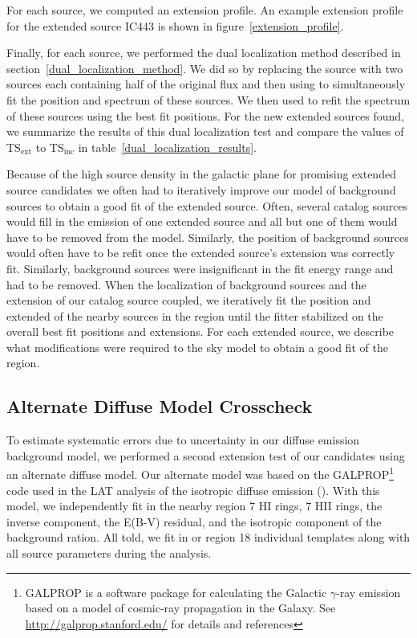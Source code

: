 \documentclass[12pt,preprint]{aastex}
\newcommand{\tsext}{{\ensuremath{\text{TS}_\text{ext}}}\xspace}
\newcommand{\tsinc}{\ensuremath{\text{TS}_\text{inc}}\xspace}
\newcommand{\pointlike}{\text{\em pointlike}\xspace}
\newcommand{\gtlike}{\text{\em gtlike}\xspace}
\begin{document}
For each source, we computed an extension profile.  An example
extension profile for the extended source IC443 is shown in
figure~\ref{extension_profile}.

Finally, for each source, we performed the dual localization method
described in section~\ref{dual_localization_method}.  We did so by
replacing the source with two sources each containing half of the original
flux and then using \pointlike to simultaneously fit the position and
spectrum of these sources.  We then used \gtlike to refit the spectrum of
these sources using the best fit positions. For the new extended sources
found, we summarize the results of this dual localization test and compare
the values of \tsext to \tsinc in table~\ref{dual_localization_results}.

Because of the high source density in the galactic plane for promising
extended source candidates we often had to iteratively improve our model
of background sources to obtain a good fit of the extended source.
Often, several catalog sources would fill in the emission of one
extended source and all but one of them would have to be removed from
the model. Similarly, the position of background sources would often
have to be refit once the extended source's extension was correctly
fit. Similarly, background sources were insignificant in the fit energy
range and had to be removed.  When the localization of background
sources and the extension of our catalog source coupled, we iteratively
fit the position and extended of the nearby sources in the region until
the fitter stabilized on the overall best fit positions and extensions.
For each extended source, we describe what modifications were required
to the sky model to obtain a good fit of the region.

\subsection{Alternate Diffuse Model Crosscheck}
\label{alt_diff_model_description}

To estimate systematic errors due to uncertainty in our diffuse
emission background model, we performed a second
extension test of our candidates using
an alternate diffuse
model. Our alternate model was based on the GALPROP\footnote{GALPROP
is a software package for calculating the Galactic $\gamma$-ray
emission based on a model of cosmic-ray propagation in the Galaxy. See
\url{http://galprop.stanford.edu/} for details and references} code
used in the LAT analysis of the isotropic diffuse emission
(\cite{isotropic_lat}).  
With this model,
we independently fit in the nearby region 
7 HI rings, 7 HII rings, the inverse component,
the E(B-V) residual, and the isotropic component of
the background ration.
All told, we fit in or region 18 individual templates along
with all source parameters during the analysis.
\end{document}

